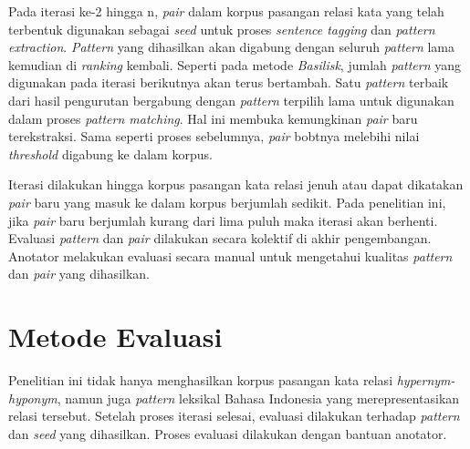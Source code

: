 Pada iterasi ke-2 hingga n, \textit{pair} dalam korpus pasangan relasi kata yang telah terbentuk digunakan sebagai \textit{seed} untuk proses \textit{sentence tagging} dan \textit{pattern extraction}. \textit{Pattern} yang dihasilkan akan digabung dengan seluruh \textit{pattern} lama kemudian di \textit{ranking} kembali. Seperti pada metode \textit{Basilisk}, jumlah \textit{pattern} yang digunakan pada iterasi berikutnya akan terus bertambah. Satu \textit{pattern} terbaik dari hasil pengurutan bergabung dengan \textit{pattern} terpilih lama untuk digunakan dalam proses \textit{pattern matching}. Hal ini membuka kemungkinan \textit{pair} baru terekstraksi. Sama seperti proses sebelumnya, \textit{pair} bobtnya melebihi nilai \textit{threshold} digabung ke dalam korpus.

Iterasi dilakukan hingga korpus pasangan kata relasi jenuh atau dapat dikatakan \textit{pair} baru yang masuk ke dalam korpus berjumlah sedikit. Pada penelitian ini, jika \textit{pair} baru berjumlah kurang dari lima puluh maka iterasi akan berhenti. Evaluasi \textit{pattern} dan \textit{pair} dilakukan secara kolektif di akhir pengembangan. Anotator melakukan evaluasi secara manual untuk mengetahui kualitas \textit{pattern} dan \textit{pair} yang dihasilkan.


\section{Metode Evaluasi}
Penelitian ini tidak hanya menghasilkan korpus pasangan kata relasi \textit{hypernym-hyponym}, namun juga \textit{pattern} leksikal Bahasa Indonesia yang merepresentasikan relasi tersebut. Setelah proses iterasi selesai, evaluasi dilakukan terhadap \textit{pattern} dan \textit{seed} yang dihasilkan. Proses evaluasi dilakukan dengan bantuan anotator.

